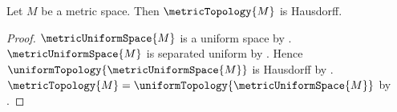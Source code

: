 \begin{theorem}\label{metric_topology_is_hausdorff}
    Let $M$ be a metric space.
    Then $\metricTopology{M}$ is Hausdorff.
\end{theorem}
\begin{proof}
    $\metricUniformSpace{M}$ is a uniform space by
        .
    $\metricUniformSpace{M}$ is separated uniform by
        .
    Hence $\uniformTopology{\metricUniformSpace{M}}$ is Hausdorff by
        .
    $\metricTopology{M}=\uniformTopology{\metricUniformSpace{M}}$ by
        .
\end{proof}
